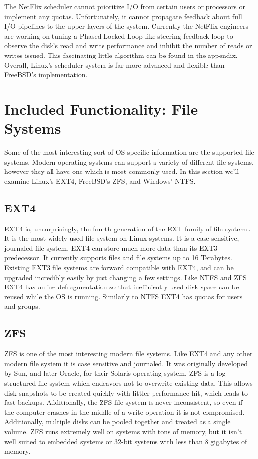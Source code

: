 \documentclass[10pt,conference,draftclsnofoot,onecolumn]{IEEEtran}
\begin{document}
The NetFlix scheduler cannot prioritize I/O from certain users or processors or implement any quotas. Unfortunately, it cannot propagate feedback about full I/O pipelines to the upper layers of the system.
Currently the NetFlix engineers are working on tuning a Phased Locked Loop like steering feedback loop to observe the disk's read and write performance and inhibit the number of reads or writes issued. This fascinating little algorithm can be found in the appendix. Overall, Linux's scheduler system is far more advanced and flexible than FreeBSD's implementation.

\section{Included Functionality: File Systems}
Some of the most interesting sort of OS specific information are the supported file systems. Modern operating systems can support a variety of different file systems, however they all have one which is most commonly used. In this section we'll examine Linux's EXT4, FreeBSD's ZFS, and Windows' NTFS.
\subsection{EXT4}
EXT4 is, unsurprisingly, the fourth generation of the EXT family of file systems. It is the most widely used file system on Linux systems. It is a case sensitive, journaled file system. EXT4 can store much more data than its EXT3 predecessor. It currently supports files and file systems up to 16 Terabytes. Existing EXT3 file systems are forward compatible with EXT4, and can be upgraded incredibly easily by just changing a few settings. Like NTFS and ZFS EXT4 has online defragmentation so that inefficiently used disk space can be reused while the OS is running. Similarly to NTFS EXT4 has quotas for users and groups\cite{ext4-perf}.

\subsection{ZFS}
ZFS is one of the most interesting modern file systems. Like EXT4 and any other modern file system it is case sensitive and journaled. It was originally developed by Sun, and later Oracle, for their Solaris operating system. ZFS is a log structured file system which endeavors not to overwrite existing data. This allows disk snapshots to be created quickly with littler performance hit, which leads to fast backups. Additionally, the ZFS file system is never inconsistent, so even if the computer crashes in the middle of a write operation it is not compromised. Additionally, multiple disks can be pooled together and treated as a single volume. ZFS runs extremely well on systems with tons of memory, but it isn't well suited to embedded systems or 32-bit systems with less than 8 gigabytes of memory\cite{3_mckusick_neville-neil_watson_2015}.
\end{document}
